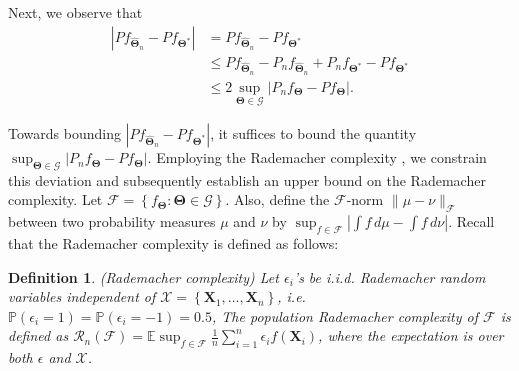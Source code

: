 \documentclass{article}
\newcommand{\E}{\mathbb{E}}
\newtheorem{defn}{Definition}
\begin{document}
Next, we observe that
\begin{align*}
    |P f_{\widehat{\bm{\Theta}}_n}- P f_{\bm{\Theta^*}}|
    &= P f_{\widehat{\bm{\Theta}}_n}- P f_{\bm{\Theta^*}}\\
    &\le P f_{\widehat{\bm{\Theta}}_n}-P_n f_{\widehat{\bm{\Theta}}_n}+P_n f_{\bm{\Theta^*}} - P f_{\bm{\Theta^*}}\\
    &\le 2\sup_{\bm{\Theta}\in \mathscr{G}}|P_n f_{\bm\Theta}-P f_{\bm\Theta}|.
\end{align*}

Towards bounding $|P f_{\widehat{\bm{\Theta}}_n}-P f_{\bm{\Theta}^*}|$, it suffices to bound the quantity $\sup _{\bm{\Theta} \in\mathscr{G}}\left|P_n f_{\bm\Theta} - P f_{\bm\Theta}\right|$. Employing the Rademacher complexity \cite{DUDLEY1967290,FoML-mohri}, we constrain this deviation and subsequently establish an upper bound on the Rademacher complexity. Let $\mathcal{F}=\left\{f_{\bm\Theta}: \bm{\Theta} \in\mathscr{G}\right\}$. Also, define the $\mathcal{F}$-norm $\|\mu-\nu\|_{\mathcal{F}}$ between two probability measures $\mu$ and $\nu$ \cite{athreya2006measure} by $ \sup_{f \in \mathcal{F}}\left|\int f \,d\mu-\int f \,d\nu\right|$. Recall that the Rademacher complexity is defined as follows:

\begin{defn}
    (Rademacher complexity) Let $\epsilon_i$'s be i.i.d. Rademacher random variables independent of $\mathcal{X}=\left\{\boldsymbol{X}_1, \ldots, \boldsymbol{X}_n\right\}$, i.e. $\mathbb{P}\left(\epsilon_i=1\right)=\mathbb{P}\left(\epsilon_i=-1\right)=0.5$, The population Rademacher complexity of $\mathcal{F}$ is defined as $\mathcal{R}_n(\mathcal{F})=\E\sup _{f \in \mathcal{F}} \frac{1}{n} \sum_{i=1}^n \epsilon_i f\left(\boldsymbol{X}_i\right)$, where the expectation is over both $\epsilon$ and $\mathcal{X}$.
\end{defn}
\end{document}
